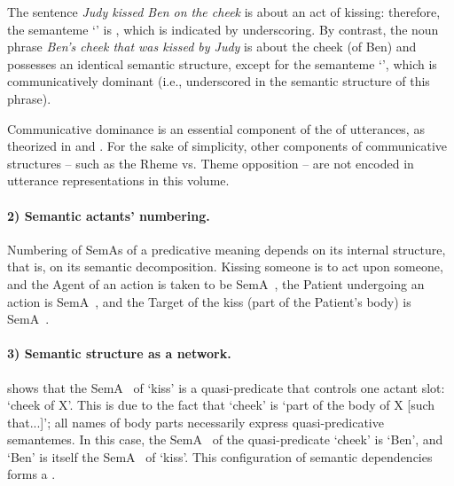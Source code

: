The sentence \textit{Judy kissed Ben on the cheek} is about an act of kissing: therefore, the semanteme `' is , which is indicated by underscoring. By contrast, the noun phrase \textit{Ben's cheek that was kissed by Judy} is about the cheek (of Ben) and possesses an identical semantic structure, except for the semanteme `', which is communicatively dominant (i.e., underscored in the semantic structure of this phrase).

Communicative dominance is an essential component of the  of utterances, as theorized in \textcite{Polguere1990a-e} and \textcite{Melcuk2001b}. For the sake of simplicity, other components of communicative structures -- such as the Rheme vs. Theme opposition -- are not encoded in utterance representations in this volume.

\paragraph*{2) Semantic actants' numbering.}

Numbering of SemAs of a predicative meaning depends on its internal structure, that is, on its semantic decomposition. Kissing someone is to act upon someone, and the Agent of an action is taken to be SemA~, the Patient undergoing an action is SemA~, and the Target of the kiss (part of the Patient's body) is SemA~.

\paragraph*{3) Semantic structure as a network.}

 shows that the SemA~ of `kiss' is a quasi-predicate that controls one actant slot: `cheek of X'. This is due to the fact that `cheek' is `part of the body of X [such that...]'; all names of body parts necessarily express quasi-predicative semantemes.  In this case, the SemA~ of the quasi-predicate `cheek' is `Ben', and `Ben' is itself the SemA~ of `kiss'. This configuration of semantic dependencies forms a .

